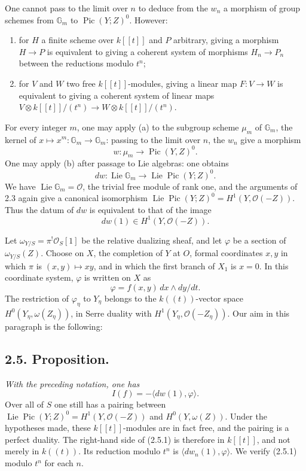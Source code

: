 \documentclass[11pt]{article}
\DeclareMathOperator{\Lie}{Lie}
\DeclareMathOperator{\Pic}{Pic}
\newcommand{\OO}{\mathcal O}
\newcommand{\GG}{\mathbb G}
\begin{document}
One cannot pass to the limit over $n$ to deduce from the $w_n$ a morphism of group schemes from $\GG_m$ to $\Pic(Y;Z)^0$. However:
\begin{enumerate}[label=(\alph*)]
\item for $H$ a finite scheme over $k[[t]]$ and $P$ arbitrary, giving a morphism $H\to P$ is equivalent to giving a coherent system of morphisms $H_n\to P_n$ between the reductions modulo $t^n$;
\item for $V$ and $W$ two free $k[[t]]$-modules, giving a linear map $F:V\to W$ is equivalent to giving a coherent system of linear maps $V\otimes k[[t]]/(t^n)\to W\otimes k[[t]]/(t^n)$.
\end{enumerate}
For every integer $m$, one may apply (a) to the subgroup scheme $\mu_m$ of $\GG_m$, the kernel of $x\mapsto x^m:\GG_m\to\GG_m$: passing to the limit over $n$, the $w_n$ give a morphism
\begin{equation}
        w:\mu_m\longrightarrow\Pic(Y,Z)^0. \tag{2.4.9}
\end{equation}
One may apply (b) after passage to Lie algebras: one obtains
\begin{equation}
        dw:\Lie\GG_m\longrightarrow\Lie\Pic(Y;Z)^0. \tag{2.4.10}
\end{equation}
We have $\Lie\GG_m=\OO$, the trivial free module of rank one, and the arguments of 2.3 again give a canonical isomorphism $\Lie\Pic(Y;Z)^0=H^1(Y,\OO(-Z))$. Thus the datum of $dw$ is equivalent to that of the image
\begin{equation}
        dw(1)\in H^1(Y,\OO(-Z)). \tag{2.4.11}
\end{equation}

Let $\omega_{Y/S}=\pi^!\OO_S[1]$ be the relative dualizing sheaf, and let $\varphi$ be a section of $\omega_{Y/S}(Z)$. Choose on $X$, the completion of $Y$ at $O$, formal coordinates $x,y$ in which $\pi$ is $(x,y)\mapsto xy$, and in which the first branch of $X_1$ is $x=0$. In this coordinate system, $\varphi$ is written on $X$ as
\[
        \varphi=f(x,y)\,dx\wedge dy/dt.
\]
The restriction of $\varphi_\eta$ to $Y_\eta$ belongs to the $k((t))$-vector space $H^0(Y_\eta,\omega(Z_\eta))$, in Serre duality with $H^1(Y_\eta,\OO(-Z_\eta))$. Our aim in this paragraph is the following:

\subsection*{2.5. Proposition.}
\emph{With the preceding notation, one has}
\begin{equation}
        I(f)=-\langle dw(1),\varphi\rangle. \tag{2.5.1}
\end{equation}
Over all of $S$ one still has a pairing between $\Lie\Pic(Y;Z)^0=H^1(Y,\OO(-Z))$ and $H^0(Y,\omega(Z))$. Under the hypotheses made, these $k[[t]]$-modules are in fact free, and the pairing is a perfect duality. The right-hand side of (2.5.1) is therefore in $k[[t]]$, and not merely in $k((t))$. Its reduction modulo $t^n$ is $\langle dw_n(1),\varphi\rangle$. We verify (2.5.1) modulo $t^n$ for each $n$.
\end{document}
